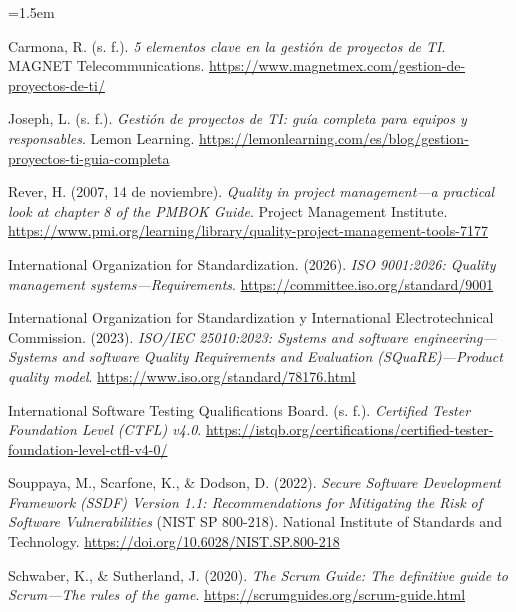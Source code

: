 \documentclass[12pt]{article}
\begin{document}
\emergencystretch=1.5em
\begin{enumerate}[
    leftmargin=1.27cm,
    label={[\arabic*]},
    itemsep=6pt
]
    \item Carmona, R. (s. f.).
    \textit{5 elementos clave en la gestión de proyectos de TI}.
    MAGNET Telecommunications.
    \url{https://www.magnetmex.com/gestion-de-proyectos-de-ti/}

    \item Joseph, L. (s. f.).
    \textit{Gestión de proyectos de TI: guía completa para equipos y responsables}.
    Lemon Learning.
    \url{https://lemonlearning.com/es/blog/gestion-proyectos-ti-guia-completa}

    \item Rever, H. (2007, 14 de noviembre).
    \textit{Quality in project management---a practical look at chapter 8 of the PMBOK Guide}.
    Project Management Institute.
    \url{https://www.pmi.org/learning/library/quality-project-management-tools-7177}

    \item International Organization for Standardization. (2026).
    \textit{ISO 9001:2026: Quality management systems---Requirements}.
    \url{https://committee.iso.org/standard/9001}

    \item International Organization for Standardization y
    International Electrotechnical Commission. (2023).
    \textit{ISO/IEC 25010:2023: Systems and software engineering---Systems
    and software Quality Requirements and Evaluation (SQuaRE)---Product quality model}.
    \url{https://www.iso.org/standard/78176.html}

    \item International Software Testing Qualifications Board. (s. f.).
    \textit{Certified Tester Foundation Level (CTFL) v4.0}.
    \url{https://istqb.org/certifications/certified-tester-foundation-level-ctfl-v4-0/}

    \item Souppaya, M., Scarfone, K., \& Dodson, D. (2022).
    \textit{Secure Software Development Framework (SSDF) Version 1.1:
    Recommendations for Mitigating the Risk of Software Vulnerabilities}
    (NIST SP 800-218).
    National Institute of Standards and Technology.
    \url{https://doi.org/10.6028/NIST.SP.800-218}

    \item Schwaber, K., \& Sutherland, J. (2020).
    \textit{The Scrum Guide: The definitive guide to Scrum---The rules of the game}.
    \url{https://scrumguides.org/scrum-guide.html}
\end{enumerate}
\end{document}
